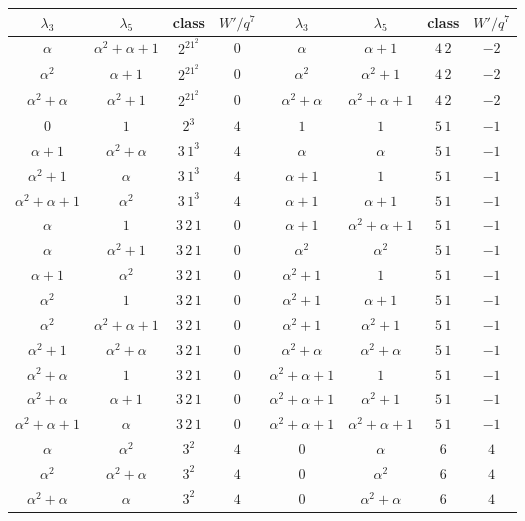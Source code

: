 ﻿\begin{tabular}{@{}cccc@{\qquad\qquad}cccc@{}}
\toprule
$\lambda_3$ & $\lambda_5$ & class & $W'/q^7$ & $\lambda_3$ & $\lambda_5$ & class & $W'/q^7$\\
\midrule
$\alpha$ & $\alpha^2+\alpha+1$ & $2^21^2$ & $0$ & $\alpha$ & $\alpha+1$ & $4\,2$ & $-2$\\
$\alpha^2$ & $\alpha+1$ & $2^21^2$ & $0$ & $\alpha^2$ & $\alpha^2+1$ & $4\,2$ & $-2$\\
$\alpha^2+\alpha$ & $\alpha^2+1$ & $2^21^2$ & $0$ & $\alpha^2+\alpha$ & $\alpha^2+\alpha+1$ & $4\,2$ & $-2$\\
$0$ & $1$ & $2^3$ & $4$ & $1$ & $1$ & $5\,1$ & $-1$\\
$\alpha+1$ & $\alpha^2+\alpha$ & $3\,1^3$ & $4$ & $\alpha$ & $\alpha$ & $5\,1$ & $-1$\\
$\alpha^2+1$ & $\alpha$ & $3\,1^3$ & $4$ & $\alpha+1$ & $1$ & $5\,1$ & $-1$\\
$\alpha^2+\alpha+1$ & $\alpha^2$ & $3\,1^3$ & $4$ & $\alpha+1$ & $\alpha+1$ & $5\,1$ & $-1$\\
$\alpha$ & $1$ & $3\,2\,1$ & $0$ & $\alpha+1$ & $\alpha^2+\alpha+1$ & $5\,1$ & $-1$\\
$\alpha$ & $\alpha^2+1$ & $3\,2\,1$ & $0$ & $\alpha^2$ & $\alpha^2$ & $5\,1$ & $-1$\\
$\alpha+1$ & $\alpha^2$ & $3\,2\,1$ & $0$ & $\alpha^2+1$ & $1$ & $5\,1$ & $-1$\\
$\alpha^2$ & $1$ & $3\,2\,1$ & $0$ & $\alpha^2+1$ & $\alpha+1$ & $5\,1$ & $-1$\\
$\alpha^2$ & $\alpha^2+\alpha+1$ & $3\,2\,1$ & $0$ & $\alpha^2+1$ & $\alpha^2+1$ & $5\,1$ & $-1$\\
$\alpha^2+1$ & $\alpha^2+\alpha$ & $3\,2\,1$ & $0$ & $\alpha^2+\alpha$ & $\alpha^2+\alpha$ & $5\,1$ & $-1$\\
$\alpha^2+\alpha$ & $1$ & $3\,2\,1$ & $0$ & $\alpha^2+\alpha+1$ & $1$ & $5\,1$ & $-1$\\
$\alpha^2+\alpha$ & $\alpha+1$ & $3\,2\,1$ & $0$ & $\alpha^2+\alpha+1$ & $\alpha^2+1$ & $5\,1$ & $-1$\\
$\alpha^2+\alpha+1$ & $\alpha$ & $3\,2\,1$ & $0$ & $\alpha^2+\alpha+1$ & $\alpha^2+\alpha+1$ & $5\,1$ & $-1$\\
$\alpha$ & $\alpha^2$ & $3^2$ & $4$ & $0$ & $\alpha$ & $6$ & $4$\\
$\alpha^2$ & $\alpha^2+\alpha$ & $3^2$ & $4$ & $0$ & $\alpha^2$ & $6$ & $4$\\
$\alpha^2+\alpha$ & $\alpha$ & $3^2$ & $4$ & $0$ & $\alpha^2+\alpha$ & $6$ & $4$\\

\end{tabular}
